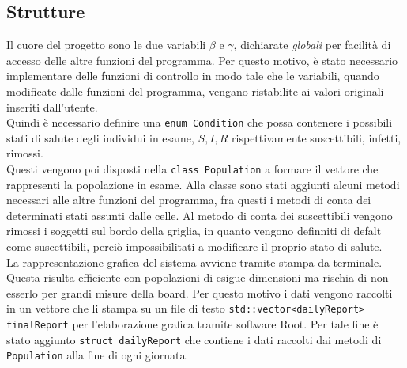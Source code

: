 \documentclass[a4paper]{article}
\begin{document}
\subsection{Strutture}
Il cuore del progetto sono le due variabili $\beta$ e $\gamma$, dichiarate \textit{globali} per facilità di accesso delle altre funzioni del programma. Per questo motivo, è stato necessario implementare delle funzioni di controllo in modo tale che le variabili, quando modificate dalle funzioni  del programma, vengano ristabilite ai valori originali inseriti dall'utente.\\
Quindi è necessario definire una \texttt{enum Condition} che possa contenere i possibili stati di salute degli individui in esame, $S, I, R$ rispettivamente suscettibili, infetti, rimossi.\\
Questi vengono poi disposti nella \texttt{class Population} a formare il vettore che rappresenti la popolazione in esame. Alla classe sono stati aggiunti alcuni metodi necessari alle altre funzioni del programma, fra questi i metodi di conta dei determinati stati assunti dalle celle. Al metodo di conta dei suscettibili vengono rimossi i soggetti sul bordo della griglia, in quanto vengono definniti di defalt come suscettibili, perciò impossibilitati a modificare il proprio stato di salute.\\
La rappresentazione grafica del sistema avviene tramite stampa da terminale. Questa risulta efficiente con popolazioni di esigue dimensioni ma rischia di non esserlo per grandi misure della board. Per questo motivo i dati vengono raccolti in un vettore che li stampa su un file di testo \texttt{std::vector<dailyReport> finalReport} per l'elaborazione grafica tramite software Root. Per tale fine è stato aggiunto \texttt{struct dailyReport} che contiene i dati raccolti dai metodi di \texttt{Population} alla fine di ogni giornata.\\
\end{document}
